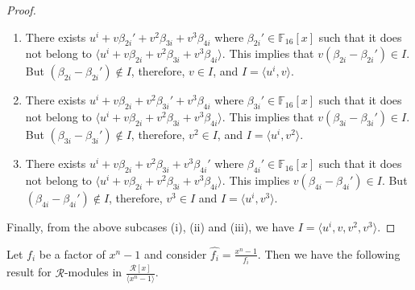 \documentclass{amsart}
\theoremstyle{definition}
\theoremstyle{remark}
\numberwithin{equation}{section}
\begin{document}
\begin{proof}
        \begin{enumerate}
              \item [(i)] There exists  $u^i + v\beta_{2i}' + v^2\beta_{3i} + v^3\beta_{4i}$ where $\beta_{2i}' \in \mathbb F_{16}[x]$ such that it does not belong to  $ \langle u^i + v\beta_{2i} + v^2\beta_{3i} + v^3\beta_{4i}\rangle.$  This implies that $v(\beta_{2i}-\beta_{2i}')\in I$. But $(\beta_{2i}-\beta_{2i}') \notin I$, therefore, $v \in I$, and $I = \langle u^i, v \rangle $.
              \item [(ii)]  There exists  $u^i + v\beta_{2i} + v^2\beta_{3i}' + v^3\beta_{4i}$ where $\beta_{3i}' \in \mathbb F_{16}[x]$ such that it does not belong to  $ \langle u^i + v\beta_{2i} + v^2\beta_{3i} + v^3\beta_{4i}\rangle.$  This implies that $v(\beta_{3i}-\beta_{3i}')\in I$. But $(\beta_{3i}-\beta_{3i}') \notin I$, therefore, $v^2 \in I$, and $I = \langle u^i, v^2 \rangle $.
              \item [(iii)] There exists $u^i + v\beta_{2i} + v^2\beta_{3i} + v^3\beta_{4i}'$ where $\beta_{4i}' \in \mathbb F_{16}[x]$ such that it does not belong to  $ \langle u^i + v\beta_{2i} + v^2\beta_{3i} + v^3\beta_{4i}\rangle.$  This implies $v(\beta_{4i}-\beta_{4i}')\in I$. But $(\beta_{4i}-\beta_{4i}') \notin I$, therefore, $v^3 \in I$ and $I =   \langle u^i, v^3 \rangle $.
        \end{enumerate}
        
        Finally, from the above subcases (i), (ii) and (iii), we have $ I = \langle u^i , v , v^2 , v^3 \rangle $. 
        \end{proof}

        Let $f_i$ be a factor of $x^n-1$ and consider $\hat{f_i}=\frac{x^n-1}{f_i}$. Then we have the following result for $\mathcal{R}$-modules in $\frac{\mathcal{R}[x]}{\langle x^n-1\rangle}$.
        
\end{document}
